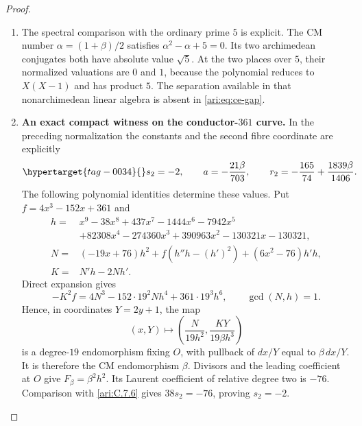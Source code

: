 \begin{proof}
\begin{enumerate}[label=\arabic*.,leftmargin=*]
\item The spectral comparison with the ordinary prime $5$ is
explicit. The CM number $\alpha=(1+\beta)/2$ satisfies
$\alpha^2-\alpha+5=0$. Its two archimedean conjugates
both have absolute value $\sqrt5$. At the two places over
$5$, their normalized valuations are $0$ and $1$, because
the polynomial reduces to $X(X-1)$ and has product $5$.
The separation available in that nonarchimedean linear
algebra is absent in \eqref{ari:eq:ce-gap}.

\item \textbf{An exact compact witness on the conductor-$361$ curve.}
In the preceding normalization the constants and the second
fibre coordinate are explicitly
\begin{equation}\hypertarget{tag-0034}{}\label{ari:eq:ce-explicit-witness}
 s_2=-2,\qquad a=-\frac{21\beta}{703},\qquad
 r_2=-\frac{165}{74}+\frac{1839\beta}{1406}.
\end{equation}
The following polynomial identities determine these values.
Put $f=4x^3-152x+361$ and
\[
 \begin{aligned}
 h={}&x^9-38x^8+437x^7-1444x^6-7942x^5\\
     &+82308x^4-274360x^3+390963x^2-130321x-130321,\\
 N={}&(-19x+76)h^2+f(h''h-(h')^2)+(6x^2-76)h'h,\\
 K={}&N'h-2Nh'.
 \end{aligned}
\]
Direct expansion gives
\[
 -K^2f=4N^3-152\cdot19^2Nh^4+361\cdot19^3h^6,
 \qquad \gcd(N,h)=1.
\]
Hence, in coordinates $Y=2y+1$, the map
\[
 (x,Y)\longmapsto
 \left(\frac{N}{19h^2},\frac{KY}{19\beta h^3}\right)
\]
is a degree-$19$ endomorphism fixing $O$, with pullback of
$dx/Y$ equal to $\beta\,dx/Y$. It is therefore the CM
endomorphism $\beta$. Divisors and the leading coefficient
at $O$ give $F_\beta=\beta^2h^2$. Its Laurent coefficient
of relative degree two is $-76$. Comparison with \ref{ari:C.7.6}
gives $38s_2=-76$, proving $s_2=-2$.


\end{enumerate}
\end{proof}
